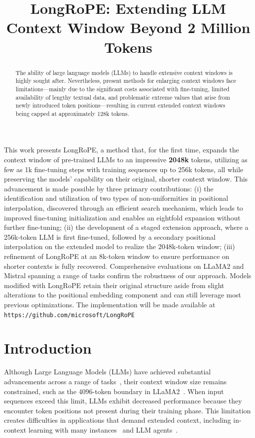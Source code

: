 \title{LongRoPE: Extending LLM Context Window Beyond 2 Million Tokens}

\begin{abstract}
The ability of large language models (LLMs) to handle extensive context windows is highly sought after. Nevertheless, present methods for enlarging context windows face limitations—mainly due to the significant costs associated with fine-tuning, limited availability of lengthy textual data, and problematic extreme values that arise from newly introduced token positions—resulting in current extended context windows being capped at approximately 128k tokens.
\end{abstract}

This work presents LongRoPE, a method that, for the first time, expands the context window of pre-trained LLMs to an impressive \textbf{2048k} tokens, utilizing as few as 1k fine-tuning steps with training sequences up to 256k tokens, all while preserving the models' capability on their original, shorter context window. This advancement is made possible by three primary contributions: (i) the identification and utilization of two types of non-uniformities in positional interpolation, discovered through an efficient search mechanism, which leads to improved fine-tuning initialization and enables an eightfold expansion without further fine-tuning; (ii) the development of a staged extension approach, where a 256k-token LLM is first fine-tuned, followed by a secondary positional interpolation on the extended model to realize the 2048k-token window; (iii) refinement of LongRoPE at an 8k-token window to ensure performance on shorter contexts is fully recovered. Comprehensive evaluations on LLaMA2 and Mistral spanning a range of tasks confirm the robustness of our approach. Models modified with LongRoPE retain their original structure aside from slight alterations to the positional embedding component and can still leverage most previous optimizations. The implementation will be made available at \texttt{https://github.com/microsoft/LongRoPE}

\section{Introduction}

Although Large Language Models (LLMs) have achieved substantial advancements across a range of tasks~\cite{gpt4,llama2}, their context window size remains constrained, such as the 4096-token boundary in LLaMA2~\cite{llama2}. When input sequences exceed this limit, LLMs exhibit decreased performance because they encounter token positions not present during their training phase. This limitation creates difficulties in applications that demand extended context, including in-context learning with many instances~\cite{Huang2023FewerIM} and LLM agents~\cite{park2023generative,madaan2023selfrefine}.

